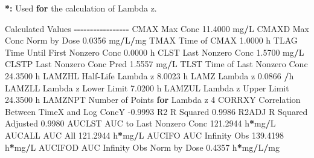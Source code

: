 \documentclass[
  12pt,
]{krantz}
\newenvironment{Shaded}{\begin{snugshade}}{\end{snugshade}}
\newcommand{\ControlFlowTok}[1]{\textcolor[rgb]{0.13,0.29,0.53}{\textbf{#1}}}
\newcommand{\DecValTok}[1]{\textcolor[rgb]{0.00,0.00,0.81}{#1}}
\newcommand{\ErrorTok}[1]{\textcolor[rgb]{0.64,0.00,0.00}{\textbf{#1}}}
\newcommand{\FloatTok}[1]{\textcolor[rgb]{0.00,0.00,0.81}{#1}}
\newcommand{\NormalTok}[1]{#1}
\newcommand{\OperatorTok}[1]{\textcolor[rgb]{0.81,0.36,0.00}{\textbf{#1}}}
\newcommand{\StringTok}[1]{\textcolor[rgb]{0.31,0.60,0.02}{#1}}
\begin{document}
\begin{Shaded}
\begin{Highlighting}[]
\OperatorTok{*}\ErrorTok{:}\StringTok{ }\NormalTok{Used }\ControlFlowTok{for}\NormalTok{ the calculation of Lambda z.}


\NormalTok{Calculated Values}
\OperatorTok{{-}{-}{-}{-}{-}{-}{-}{-}{-}{-}{-}{-}{-}{-}{-}{-}{-}}
\NormalTok{CMAX       Max Conc                                       }\FloatTok{11.4000}\NormalTok{ mg}\OperatorTok{/}\NormalTok{L}
\NormalTok{CMAXD      Max Conc Norm by Dose                           }\FloatTok{0.0356}\NormalTok{ mg}\OperatorTok{/}\NormalTok{L}\OperatorTok{/}\NormalTok{mg}
\NormalTok{TMAX       Time of CMAX                                    }\FloatTok{1.0000}\NormalTok{ h}
\NormalTok{TLAG       Time Until First Nonzero Conc                   }\FloatTok{0.0000}\NormalTok{ h}
\NormalTok{CLST       Last Nonzero Conc                               }\FloatTok{1.5700}\NormalTok{ mg}\OperatorTok{/}\NormalTok{L}
\NormalTok{CLSTP      Last Nonzero Conc Pred                          }\FloatTok{1.5557}\NormalTok{ mg}\OperatorTok{/}\NormalTok{L}
\NormalTok{TLST       Time of Last Nonzero Conc                      }\FloatTok{24.3500}\NormalTok{ h}
\NormalTok{LAMZHL     Half}\OperatorTok{{-}}\NormalTok{Life Lambda z                              }\FloatTok{8.0023}\NormalTok{ h}
\NormalTok{LAMZ       Lambda z                                        }\FloatTok{0.0866} \OperatorTok{/}\NormalTok{h}
\NormalTok{LAMZLL     Lambda z Lower Limit                            }\FloatTok{7.0200}\NormalTok{ h}
\NormalTok{LAMZUL     Lambda z Upper Limit                           }\FloatTok{24.3500}\NormalTok{ h}
\NormalTok{LAMZNPT    Number of Points }\ControlFlowTok{for}\NormalTok{ Lambda z                   }\DecValTok{4}
\NormalTok{CORRXY     Correlation Between TimeX and Log ConcY        }\FloatTok{{-}0.9993} 
\NormalTok{R2         R Squared                                       }\FloatTok{0.9986} 
\NormalTok{R2ADJ      R Squared Adjusted                              }\FloatTok{0.9980} 
\NormalTok{AUCLST     AUC to Last Nonzero Conc                      }\FloatTok{121.2944}\NormalTok{ h}\OperatorTok{*}\NormalTok{mg}\OperatorTok{/}\NormalTok{L}
\NormalTok{AUCALL     AUC All                                       }\FloatTok{121.2944}\NormalTok{ h}\OperatorTok{*}\NormalTok{mg}\OperatorTok{/}\NormalTok{L}
\NormalTok{AUCIFO     AUC Infinity Obs                              }\FloatTok{139.4198}\NormalTok{ h}\OperatorTok{*}\NormalTok{mg}\OperatorTok{/}\NormalTok{L}
\NormalTok{AUCIFOD    AUC Infinity Obs Norm by Dose                   }\FloatTok{0.4357}\NormalTok{ h}\OperatorTok{*}\NormalTok{mg}\OperatorTok{/}\NormalTok{L}\OperatorTok{/}\NormalTok{mg}

\end{Highlighting}
\end{Shaded}
\end{document}
